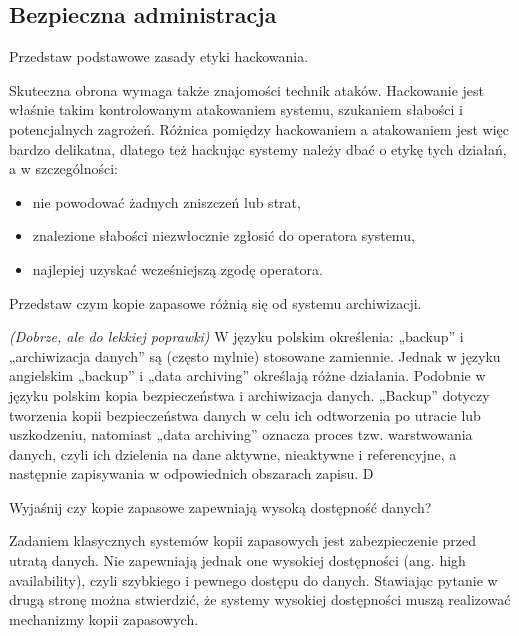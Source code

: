 \documentclass[answers,11pt]{exam}
\newcommand{\fixit}{\textit{(Dobrze, ale do lekkiej poprawki)} }
\begin{document}
\subsection{Bezpieczna administracja}
\begin{questions}

\question Przedstaw podstawowe zasady etyki hackowania.
\begin{solution}
Skuteczna obrona wymaga także znajomości technik ataków. Hackowanie jest właśnie takim kontrolowanym atakowaniem systemu, szukaniem słabości i potencjalnych zagrożeń. Różnica pomiędzy hackowaniem a atakowaniem jest więc bardzo delikatna, dlatego też hackując systemy należy dbać o etykę tych działań, a w szczególności:
\begin{itemize}
\item nie powodować żadnych zniszczeń lub strat,
\item znalezione słabości niezwłocznie zgłosić do operatora systemu,
\item najlepiej uzyskać wcześniejszą zgodę operatora.
\end{itemize}
\end{solution}

\question Przedstaw czym kopie zapasowe różnią się od systemu archiwizacji.
\begin{solution}
\fixit
W języku polskim określenia: „backup” i „archiwizacja danych” są (często mylnie) stosowane zamiennie. Jednak w języku angielskim „backup” i „data archiving” określają różne działania. Podobnie w języku polskim kopia bezpieczeństwa i archiwizacja danych. „Backup” dotyczy tworzenia kopii bezpieczeństwa danych w celu ich odtworzenia po utracie lub uszkodzeniu, natomiast „data archiving” oznacza proces tzw. warstwowania danych, czyli ich dzielenia na dane aktywne, nieaktywne i referencyjne, a następnie zapisywania w odpowiednich obszarach zapisu. D
\end{solution}

\question Wyjaśnij czy kopie zapasowe zapewniają wysoką dostępność danych?
\begin{solution}
Zadaniem klasycznych systemów kopii zapasowych jest zabezpieczenie przed utratą danych. Nie zapewniają jednak one wysokiej dostępności (ang. high availability), czyli szybkiego i pewnego dostępu do danych. Stawiając pytanie w drugą stronę można stwierdzić, że systemy wysokiej dostępności muszą realizować mechanizmy kopii zapasowych.
\end{solution}


\end{questions}
\end{document}
